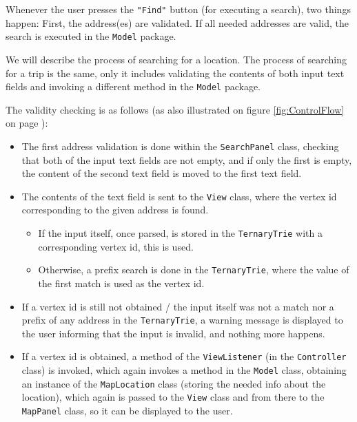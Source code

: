 Whenever the user presses the \texttt{"Find"} button (for executing a search), two things happen: First, the address(es) are validated. If all needed addresses are valid, the search is executed in the \texttt{Model} package.

We will describe the process of searching for a location. The process of searching for a trip is the same, only it includes validating the contents of both input text fields and invoking a different method in the \texttt{Model} package.

The validity checking is as follows (as also illustrated on figure \ref{fig:ControlFlow} on page \pageref{fig:ControlFlow}):
\begin{itemize}
	\item The first address validation is done within the \texttt{SearchPanel} class, checking that both of the input text fields are not empty, and if only the first is empty, the content of the second text field is moved to the first text field.
	\item The contents of the text field is sent to the \texttt{View} class, where the vertex id corresponding to the given address is found.
	\begin{itemize}
		\item If the input itself, once parsed, is stored in the \texttt{TernaryTrie} with a corresponding vertex id, this is used.
		\item Otherwise, a prefix search is done in the \texttt{TernaryTrie}, where the value of the first match is used as the vertex id.
	\end{itemize}
	\item If a vertex id is still not obtained / the input itself was not a match nor a prefix of any address in the \texttt{TernaryTrie}, a warning message is displayed to the user informing that the input is invalid, and nothing more happens.
	\item If a vertex id is obtained, a method of the \texttt{ViewListener} (in the \texttt{Controller} class) is invoked, which again invokes a method in the \texttt{Model} class, obtaining an instance of the \texttt{MapLocation} class (storing the needed info about the location), which again is passed to the \texttt{View} class and from there to the \texttt{MapPanel} class, so it can be displayed to the user.
\end{itemize}


